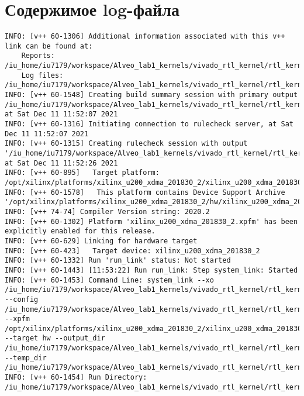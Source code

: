 \chapter{Содержимое log-файла}
\label{cha:appendix1}
\begin{lstlisting}[label=func,breaklines=true,breakatwhitespace=false,caption=СОДЕРЖИМОЕ LOG-ФАЙЛА.]
INFO: [v++ 60-1306] Additional information associated with this v++ link can be found at:
	Reports: /iu_home/iu7179/workspace/Alveo_lab1_kernels/vivado_rtl_kernel/rtl_kernel_wizard_0_ex/exports/_x/reports/link
	Log files: /iu_home/iu7179/workspace/Alveo_lab1_kernels/vivado_rtl_kernel/rtl_kernel_wizard_0_ex/exports/_x/logs/link
INFO: [v++ 60-1548] Creating build summary session with primary output /iu_home/iu7179/workspace/Alveo_lab1_kernels/vivado_rtl_kernel/rtl_kernel_wizard_0_ex/exports/vinc.xclbin.link_summary, at Sat Dec 11 11:52:07 2021
INFO: [v++ 60-1316] Initiating connection to rulecheck server, at Sat Dec 11 11:52:07 2021
INFO: [v++ 60-1315] Creating rulecheck session with output '/iu_home/iu7179/workspace/Alveo_lab1_kernels/vivado_rtl_kernel/rtl_kernel_wizard_0_ex/exports/_x/reports/link/v++_link_vinc_guidance.html', at Sat Dec 11 11:52:26 2021
INFO: [v++ 60-895]   Target platform: /opt/xilinx/platforms/xilinx_u200_xdma_201830_2/xilinx_u200_xdma_201830_2.xpfm
INFO: [v++ 60-1578]   This platform contains Device Support Archive '/opt/xilinx/platforms/xilinx_u200_xdma_201830_2/hw/xilinx_u200_xdma_201830_2.dsa'
INFO: [v++ 74-74] Compiler Version string: 2020.2
INFO: [v++ 60-1302] Platform 'xilinx_u200_xdma_201830_2.xpfm' has been explicitly enabled for this release.
INFO: [v++ 60-629] Linking for hardware target
INFO: [v++ 60-423]   Target device: xilinx_u200_xdma_201830_2
INFO: [v++ 60-1332] Run 'run_link' status: Not started
INFO: [v++ 60-1443] [11:53:22] Run run_link: Step system_link: Started
INFO: [v++ 60-1453] Command Line: system_link --xo /iu_home/iu7179/workspace/Alveo_lab1_kernels/vivado_rtl_kernel/rtl_kernel_wizard_0_ex/exports/rtl_kernel_wizard_0.xo --config /iu_home/iu7179/workspace/Alveo_lab1_kernels/vivado_rtl_kernel/rtl_kernel_wizard_0_ex/exports/_x/link/int/syslinkConfig.ini --xpfm /opt/xilinx/platforms/xilinx_u200_xdma_201830_2/xilinx_u200_xdma_201830_2.xpfm --target hw --output_dir /iu_home/iu7179/workspace/Alveo_lab1_kernels/vivado_rtl_kernel/rtl_kernel_wizard_0_ex/exports/_x/link/int --temp_dir /iu_home/iu7179/workspace/Alveo_lab1_kernels/vivado_rtl_kernel/rtl_kernel_wizard_0_ex/exports/_x/link/sys_link
INFO: [v++ 60-1454] Run Directory: /iu_home/iu7179/workspace/Alveo_lab1_kernels/vivado_rtl_kernel/rtl_kernel_wizard_0_ex/exports/_x/link/run_link

\end{lstlisting}
